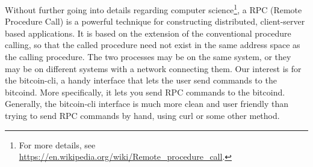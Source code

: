 \bigskip
\noindent
Without further going into details regarding computer science\footnote{For more details, see \url{https://en.wikipedia.org/wiki/Remote\_procedure\_call}.}, a RPC (Remote Procedure Call) is a powerful technique for constructing distributed, client-server based applications. It is based on the extension of the conventional procedure calling, so that the called procedure need not exist in the same address space as the calling procedure. The two processes may be on the same system, or they may be on different systems with a network connecting them. Our interest is for the \colorbox{Grey!10}{bitcoin-cli}, a handy interface that lets the user send commands to the \colorbox{Grey!10}{bitcoind}. More specifically, it lets you send RPC commands to the \colorbox{Grey!10}{bitcoind}. Generally, the \colorbox{Grey!10}{bitcoin-cli} interface is much more clean and user friendly than trying to send RPC commands by hand, using \colorbox{Grey!10}{curl} or some other method.

